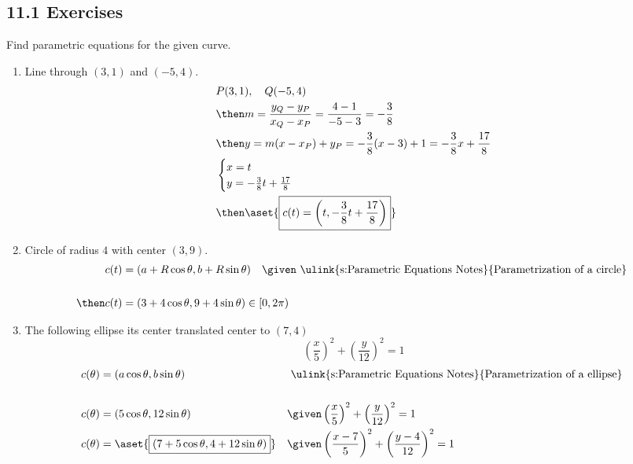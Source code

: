 \subsection{11.1 Exercises}
Find parametric equations for the given curve.
\begin{enumerate}[itemsep=14em]
  \item Line through \((3,1)\) and \((-5, 4)\).
    \begin{align*}
      &P(3,1), \quad Q(-5, 4) \\
      &\then m = \frac{y_Q - y_P}{x_Q - x_P}  = \frac{4-1}{-5 -3} = -\frac{3}{8} \\
      &\then y = m (x-x_P) + y_P = -\frac{3}{8}(x-3) + 1 = -\frac{3}{8}x + \frac{17}{8}\\
      &\begin{cases}
        x = t \\
        y = -\frac{3}{8}t + \frac{17}{8}
      \end{cases}\\
      &\then \aset{\boxed{c(t) = \left( t, -\frac{3}{8}t + \frac{17}{8} \right)}}
    \end{align*}

  \vspace{-12em}
  \item Circle of radius \(4\) with center \((3, 9)\).
    \begin{align*}
      c(t) &= (a + R \cos \theta , b + R \sin \theta) \quad
      \given \text{ \ulink{s:Parametric Equations Notes}{Parametrization of a circle} }\\
      \\
      \then c(t) &= (3 + 4 \cos \theta, 9 + 4 \sin \theta) \in \left[ 0, 2\pi \right)
    \end{align*}

  \vspace{-9em}
  \item The following ellipse its center translated center to \((7, 4)\)
    \[%
      \left( \frac{x}{5} \right)^2 + \left( \frac{y}{12} \right)^2 = 1
    \]%
    \begin{align*}
      c(\theta) &= (a \cos \theta , b \sin \theta)
                && \text{ \ulink{s:Parametric Equations Notes}{Parametrization of a ellipse} }\\
      \\
      c(\theta) &= (5 \cos \theta, 12 \sin \theta)
                && \given \left( \frac{x}{5} \right)^2 + \left( \frac{y}{12} \right)^2 = 1 \\
      c(\theta) &= \aset{\boxed{(7 + 5 \cos \theta, 4 + 12 \sin \theta)}}
                && \given \left( \frac{x-7}{5} \right)^2 + \left( \frac{y-4}{12} \right)^2 = 1
    \end{align*}

\end{enumerate}
